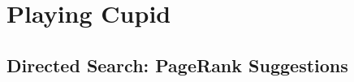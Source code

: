 \section{Playing Cupid}
\label{sec: Chapter 4}
\lipsum[4]

\subsection{Directed Search: PageRank Suggestions}
\label{sec: sub chapter in chapter 4}
\lipsum[5]


